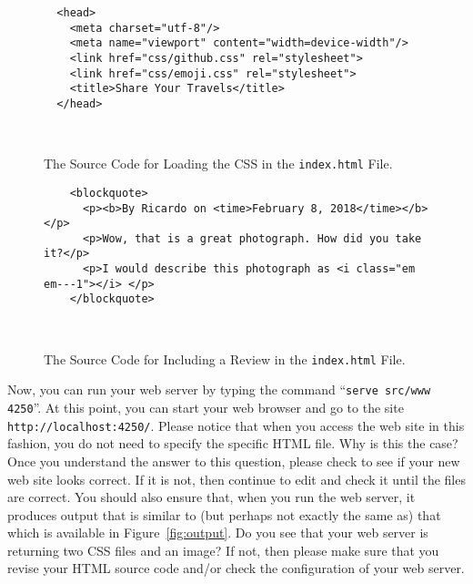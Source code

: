 \documentclass[11pt]{article}
\newcommand{\mainprogram}{\lstinline{index.html}}
\newcommand{\command}[1]{``\lstinline{#1}''}
\newcommand{\url}[1]{\lstinline{#1}}
\begin{document}
\begin{figure}[t]
  \centering
  \begin{verbatim}
  <head>
    <meta charset="utf-8"/>
    <meta name="viewport" content="width=device-width"/>
    <link href="css/github.css" rel="stylesheet">
    <link href="css/emoji.css" rel="stylesheet">
    <title>Share Your Travels</title>
  </head>
  \end{verbatim}
  \vspace*{-.35in}
  \caption{The Source Code for Loading the CSS in the \mainprogram{} File.}~\label{fig:css}
\end{figure}

\begin{figure}[t]
  \centering
  \begin{verbatim}
    <blockquote>
      <p><b>By Ricardo on <time>February 8, 2018</time></b></p>
      <p>Wow, that is a great photograph. How did you take it?</p>
      <p>I would describe this photograph as <i class="em em---1"></i> </p>
    </blockquote>
  \end{verbatim}
  \vspace*{-.35in}
  \caption{The Source Code for Including a Review in the \mainprogram{} File.}~\label{fig:code}
  \vspace*{-.25in}
\end{figure}

Now, you can run your web server by typing the command \command{serve src/www
4250}. At this point, you can start your web browser and go to the site
\url{http://localhost:4250/}. Please notice that when you access the web site in
this fashion, you do not need to specify the specific HTML file. Why is this the
case? Once you understand the answer to this question, please check to see if
your new web site looks correct. If it is not, then continue to edit and check
it until the files are correct. You should also ensure that, when you run the
web server, it produces output that is similar to (but perhaps not exactly the
same as) that which is available in Figure~\ref{fig:output}. Do you see that
your web server is returning two CSS files and an image? If not, then please
make sure that you revise your HTML source code and/or check the configuration
of your web server.
\end{document}
